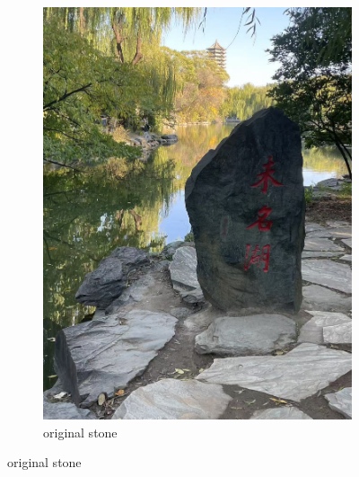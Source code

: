 \documentclass[11pt]{article}
\begin{document}
\begin{figure}[ht!]
\begin{subfigure}[]{0.333\linewidth}
        \includegraphics[width=\linewidth]{fig/stone.jpg}
        \caption{original stone}
    \end{subfigure}%
\end{figure}
\end{document}
